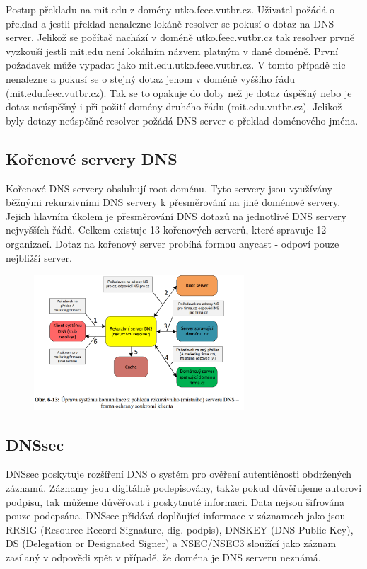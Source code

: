 Postup překladu na mit.edu z domény utko.feec.vutbr.cz.
Uživatel požádá o překlad a jestli překlad nenalezne lokáně resolver se pokusí o dotaz na DNS server.
Jelikož se počítač nachází v doméně utko.feec.vutbr.cz tak resolver prvně vyzkouší jestli mit.edu není lokálním názvem platným v dané doméně.
První požadavek může vypadat jako mit.edu.utko.feec.vutbr.cz.
V tomto případě nic nenalezne a pokusí se o stejný dotaz jenom v doméně vyššího řádu (mit.edu.feec.vutbr.cz).
Tak se to opakuje do doby než je dotaz úspěšný nebo je dotaz neúspěšný i při požití domény druhého řádu (mit.edu.vutbr.cz).
Jelikož byly dotazy neúspěšné resolver požádá DNS server o překlad doménového jména.

\subsection{Kořenové servery DNS}

Kořenové DNS servery obsluhují root doménu.
Tyto servery jsou využívány běžnými rekurzivními DNS servery k přesměrování na jiné doménové servery.
Jejich hlavním úkolem je přesměrování DNS dotazů na jednotlivé DNS servery nejvyšších řádů.
Celkem existuje 13 kořenových serverů, které spravuje 12 organizací.
Dotaz na kořenový server probíhá formou anycast - odpoví pouze nejbližší server.

\begin{figure}[!h]
    \centering
    \includegraphics[width=0.7\textwidth]{obrazky/040.png}
\end{figure}

\subsection{DNSsec}

DNSsec poskytuje rozšíření DNS o systém pro ověření autentičnosti obdržených záznamů.
Záznamy jsou digitálně podepisovány, takže pokud důvěřujeme autorovi podpisu, tak můžeme důvěřovat i poskytnuté informaci.
Data nejsou šifrována pouze podepsána.
DNSsec přidává doplňující informace v záznamech jako jsou RRSIG (Resource Record Signature, dig. podpis), DNSKEY (DNS Public Key), DS (Delegation or Designated Signer) a NSEC/NSEC3 sloužící jako záznam zasílaný v odpovědi zpět v případě, že doména je DNS serveru neznámá.





